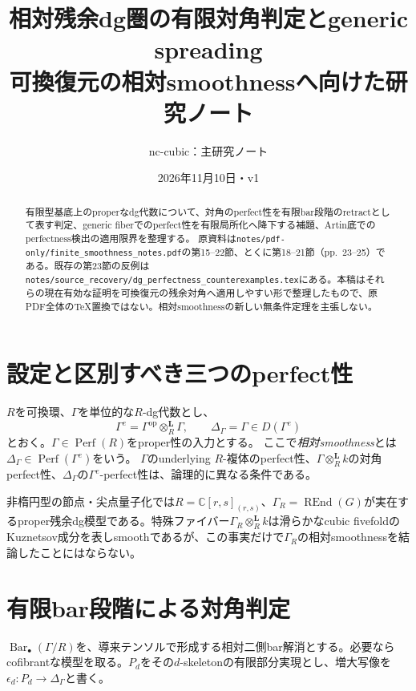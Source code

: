 \documentclass[a4paper,11pt]{ltjsarticle}
\title{相対残余dg圏の有限対角判定とgeneric spreading\\\large 可換復元の相対smoothnessへ向けた研究ノート}
\author{nc-cubic：主研究ノート}
\date{2026年11月10日・v1}
\theoremstyle{remark}
\newcommand{\Perf}{\operatorname{Perf}}
\newcommand{\otL}{\otimes^{\mathbf L}}
\begin{document}
\maketitle
\begin{abstract}
有限型基底上のproperなdg代数について、対角のperfect性を有限bar段階のretractとして表す判定、generic fiberでのperfect性を有限局所化へ降下する補題、Artin底でのperfectness検出の適用限界を整理する。
原資料は\texttt{notes/pdf-only/finite\_smoothness\_notes.pdf}の第15--22節、とくに第18--21節（pp.~23--25）である。既存の第23節の反例は\texttt{notes/source\_recovery/dg\_perfectness\_counterexamples.tex}にある。本稿はそれらの現在有効な証明を可換復元の残余対角へ適用しやすい形で整理したもので、原PDF全体のTeX置換ではない。相対smoothnessの新しい無条件定理を主張しない。
\end{abstract}

\section{設定と区別すべき三つのperfect性}
$R$を可換環、$\Gamma$を単位的な$R$-dg代数とし、
\[
 \Gamma^e=\Gamma^{\mathrm{op}}\otL_R\Gamma,\qquad
 \Delta_\Gamma=\Gamma\in D(\Gamma^e)
\]
とおく。$\Gamma\in\Perf(R)$をproper性の入力とする。
ここで\emph{相対smoothness}とは$\Delta_\Gamma\in\Perf(\Gamma^e)$をいう。
$\Gamma$のunderlying $R$-複体のperfect性、$\Gamma\otL_Rk$の対角perfect性、$\Delta_\Gamma$の$\Gamma^e$-perfect性は、論理的に異なる条件である。

非楕円型の節点・尖点量子化では$R=\mathbb C[r,s]_{(r,s)}$、$\Gamma_R=\operatorname{REnd}(G)$が実在するproper残余dg模型である。特殊ファイバー$\Gamma_R\otL_Rk$は滑らかなcubic fivefoldのKuznetsov成分を表しsmoothであるが、この事実だけで$\Gamma_R$の相対smoothnessを結論したことにはならない。

\section{有限bar段階による対角判定}
$\operatorname{Bar}_\bullet(\Gamma/R)$を、導来テンソルで形成する相対二側bar解消とする。必要ならcofibrantな模型を取る。$P_d$をその$d$-skeletonの有限部分実現とし、増大写像を$\epsilon_d:P_d\to\Delta_\Gamma$と書く。
\end{document}
